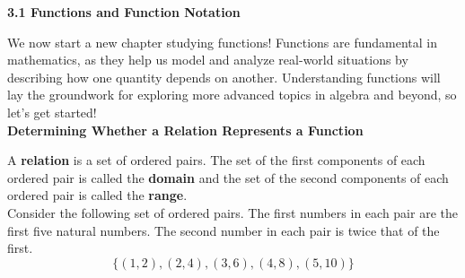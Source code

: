 \documentclass[12pt]{book}
\begin{document}
\begin{comment}
Name: \underline{\hspace{100mm}}
\vspace{20mm}
  \centerline{\Large \textbf{Chapter 2: Equations and Inequalities} } 

{\large
\begin{center}
\begin{varwidth}{\textwidth}
\begin{enumerate}[2.1]
    \item The Regular Coordinate System and Graphs
    \item Linear Equations in One Variable
    \item Models and  Applications (Skipping)
    \item Complex Numbers
    \item Quadratic Equations
    \item Other Types of Equations
    \item Linear Inequalities and Absolute Value Inequalities
\end{enumerate}
\end{varwidth}
\end{center}

}
\newpage  
\end{comment}

\textbf{{\Large 3.1 Functions and Function Notation}}
\vspace{5mm}

We now start a new chapter studying functions! Functions are fundamental in mathematics, as they help us model and analyze real-world situations by describing how one quantity depends on another. Understanding functions will lay the groundwork for exploring more advanced topics in algebra and beyond, so let's get started!
\\

{\large \textbf{Determining Whether a Relation Represents a Function}}
\vspace{3mm}

A \textbf{relation} is a set of ordered pairs. The set of the first components of each ordered pair is called the \textbf{domain} and the set of the second components of each ordered pair is called the \textbf{range}. \\

Consider the following set of ordered pairs. The first numbers in each pair are the first five natural numbers. The second number in each pair is twice that of the first.
$$ \{(1,2), (2,4), (3,6), (4,8), (5,10) \}$$
\end{document}
